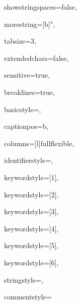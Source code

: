 {%

showstringspaces=false,

morestring=[b]",

tabsize=3,

extendedchars=false,

sensitive=true,

breaklines=true,

basicstyle=\ttfamily,

captionpos=b,

columns=[l]fullflexible,

identifierstyle={\ttfamily\color{black}},

keywordstyle=[1]{\ttfamily\color{dkviolet}},

keywordstyle=[2]{\ttfamily\color{dkgreen}},

keywordstyle=[3]{\ttfamily\color{lightblue}},

keywordstyle=[4]{\ttfamily\color{dkblue}},

keywordstyle=[5]{\ttfamily\color{red}},

keywordstyle=[6]{\ttfamily\color{dkviolet}},

stringstyle=\ttfamily,

commentstyle=\rmfamily
}
